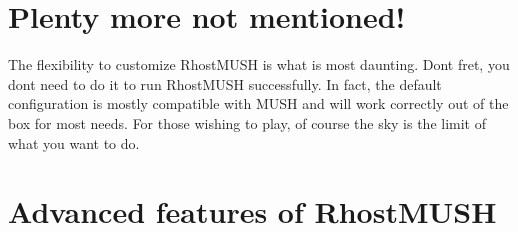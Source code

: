 \documentclass[letterpaper,10pt,english]{sphinxmanual}
\begin{document}
\begin{sphinxVerbatim}[commandchars=\\\{\}]
 \PYG{p}{[}\PYG{p}{]} \PYG{p}{[}

  
 \PYG{p}{[}
\PYG{p}{]} \PYG{p}{[}
\PYG{p}{]}
\end{sphinxVerbatim}


\section{Plenty more not mentioned!}
\label{\detokenize{features:plenty-more-not-mentioned}}
\sphinxAtStartPar
The flexibility to customize RhostMUSH is what is most daunting.
Don\textquotesingle{}t fret, you don\textquotesingle{}t need to do it to run RhostMUSH successfully.
In fact, the default configuration is mostly compatible with
MUSH and will work correctly out of the box for most needs.  For those
wishing to play, of course the sky is the limit of what you want to
do.


\section{Advanced features of RhostMUSH}
\label{\detokenize{features:advanced-features-of-rhostmush}}
\end{document}
